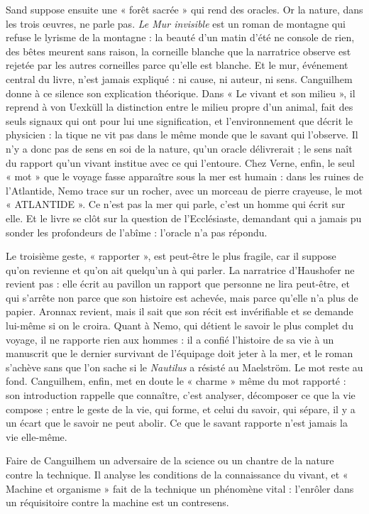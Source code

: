 \documentclass[11pt,a4paper]{article}
\begin{document}
Sand suppose ensuite une « forêt sacrée » qui rend des oracles. Or la nature, dans les trois œuvres, ne parle pas. \emph{Le Mur invisible} est un roman de montagne qui refuse le lyrisme de la montagne : la beauté d'un matin d'été ne console de rien, des bêtes meurent sans raison, la corneille blanche que la narratrice observe est rejetée par les autres corneilles parce qu'elle est blanche. Et le mur, événement central du livre, n'est jamais expliqué : ni cause, ni auteur, ni sens. Canguilhem donne à ce silence son explication théorique. Dans « Le vivant et son milieu », il reprend à von Uexküll la distinction entre le milieu propre d'un animal, fait des seuls signaux qui ont pour lui une signification, et l'environnement que décrit le physicien : la tique ne vit pas dans le même monde que le savant qui l'observe. Il n'y a donc pas de sens en soi de la nature, qu'un oracle délivrerait ; le sens naît du rapport qu'un vivant institue avec ce qui l'entoure. Chez Verne, enfin, le seul « mot » que le voyage fasse apparaître sous la mer est humain : dans les ruines de l'Atlantide, Nemo trace sur un rocher, avec un morceau de pierre crayeuse, le mot « ATLANTIDE ». Ce n'est pas la mer qui parle, c'est un homme qui écrit sur elle. Et le livre se clôt sur la question de l'Ecclésiaste, demandant qui a jamais pu sonder les profondeurs de l'abîme : l'oracle n'a pas répondu.

Le troisième geste, « rapporter », est peut-être le plus fragile, car il suppose qu'on revienne et qu'on ait quelqu'un à qui parler. La narratrice d'Haushofer ne revient pas : elle écrit au pavillon un rapport que personne ne lira peut-être, et qui s'arrête non parce que son histoire est achevée, mais parce qu'elle n'a plus de papier. Aronnax revient, mais il sait que son récit est invérifiable et se demande lui-même si on le croira. Quant à Nemo, qui détient le savoir le plus complet du voyage, il ne rapporte rien aux hommes : il a confié l'histoire de sa vie à un manuscrit que le dernier survivant de l'équipage doit jeter à la mer, et le roman s'achève sans que l'on sache si le \emph{Nautilus} a résisté au Maelström. Le mot reste au fond. Canguilhem, enfin, met en doute le « charme » même du mot rapporté : son introduction rappelle que connaître, c'est analyser, décomposer ce que la vie compose ; entre le geste de la vie, qui forme, et celui du savoir, qui sépare, il y a un écart que le savoir ne peut abolir. Ce que le savant rapporte n'est jamais la vie elle-même.

\begin{piege}

Faire de Canguilhem un adversaire de la science ou un chantre de la nature contre la technique. Il analyse les conditions de la connaissance du vivant, et « Machine et organisme » fait de la technique un phénomène vital : l'enrôler dans un réquisitoire contre la machine est un contresens.

\end{piege}
\end{document}
